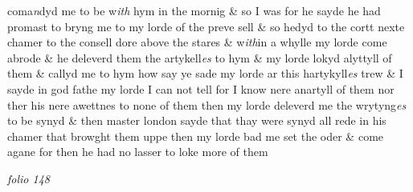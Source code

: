 \documentclass[12pt, a4paper]{book}
\begin{document}
 coma\textit{n}dyd me to be w\textit{ith} hym in the mornig \& so I was for he sayde he
 had promast to bryng me to my
			 lorde of the preve sell \& so hedyd to the
 cortt nexte chamer to the consell dore above the stares \& w\textit{ith}in a
 whylle my lorde come abrode \& he deleverd them the artykell\textit{es} to hym
 \& my lorde lokyd alyttyll of them \& callyd me to hym
			 how say ye sade
 my lorde ar this hartykyll\textit{es} trew \& I sayde in god fathe my lorde I
 can not tell for I know nere anartyll of them nor ther his nere awettnes
 to none of them then my lorde deleverd me the wrytyng\textit{es }to be synyd \&
 		then master london sayde that thay were synyd all rede in his chamer
 that browght them uppe then my lorde bad me set the oder \& come agane
 for then he had no lasser to loke more of them

\dotfill
						\newpage
{}

\textit{folio 148}
\end{document}
